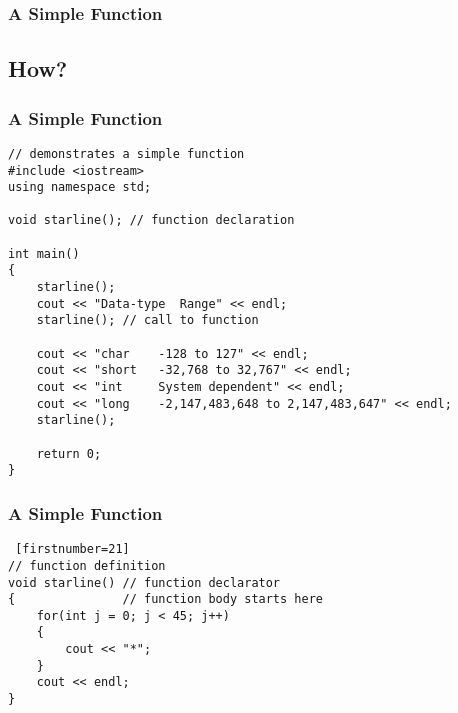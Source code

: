 \documentclass{beamer}
\begin{document}
\begin{frame}[fragile]
    \frametitle{A Simple Function}
    \subsection{How?} %
    \label{sub:how}
    \subsubsection{A Simple Function} %
    \label{ssub:a_simple_function}
    \lstset{style=mystyle}
\begin{lstlisting}
// demonstrates a simple function
#include <iostream>
using namespace std;

void starline(); // function declaration

int main()
{
    starline();
    cout << "Data-type  Range" << endl;
    starline(); // call to function

    cout << "char    -128 to 127" << endl;
    cout << "short   -32,768 to 32,767" << endl;
    cout << "int     System dependent" << endl;
    cout << "long    -2,147,483,648 to 2,147,483,647" << endl;
    starline();

    return 0;
}
\end{lstlisting}
\end{frame}

\begin{frame}[fragile]
    \frametitle{A Simple Function}
    \lstset{style=mystyle}
\begin{lstlisting} [firstnumber=21]
// function definition
void starline() // function declarator
{               // function body starts here
    for(int j = 0; j < 45; j++)
    {
        cout << "*";
    }
    cout << endl;
}
\end{lstlisting}
\end{frame}
\end{document}
